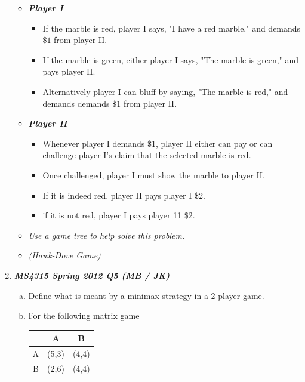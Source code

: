 \documentclass[]{report}
\begin{document}
\begin{enumerate}
\begin{itemize}
	\item \textbf{\textit{Player I}}
	\begin{itemize}
		\item If the marble is red, player I says, "I have a red marble," and demands $\$1$ from player II.
		\item If the marble is green, either player I says, "The marble is green," and pays player II.
		\item Alternatively player I can bluff by saying, "The marble is red," and demands demands $\$1$ from player II. 
	\end{itemize}
	\item \textbf{\textit{Player II}}
	\begin{itemize}
		\item Whenever player I demands \$1, player II either can pay or can challenge player I's claim that the selected marble is red. 
		\item Once challenged, player I must show the marble to player II. 
		\item If it is indeed red. player II pays player I \$2.
		\item if it is not red, player I pays player 11 \$2. 
	\end{itemize}
	\item \textit{Use a game tree to help solve this problem.}
	\item \textit{(Hawk-Dove Game)}
\end{itemize}


\item \textbf{\textit{MS4315 Spring 2012 Q5  (MB / JK)}}

\begin{enumerate}[(a)]
	\item Define what is meant by a minimax strategy in a 2-player game. 
	\item For the following matrix game
	
	
	\begin{center}
		\begin{tabular}{|c|c|c|} \hline 
			& A & B \\ \hline
			A & (5,3) & (4,4) \\ \hline
			B & (2,6) & (4,4) \\ \hline
			

\end{tabular}
\end{center}
\end{enumerate}
\end{enumerate}
\end{document}
